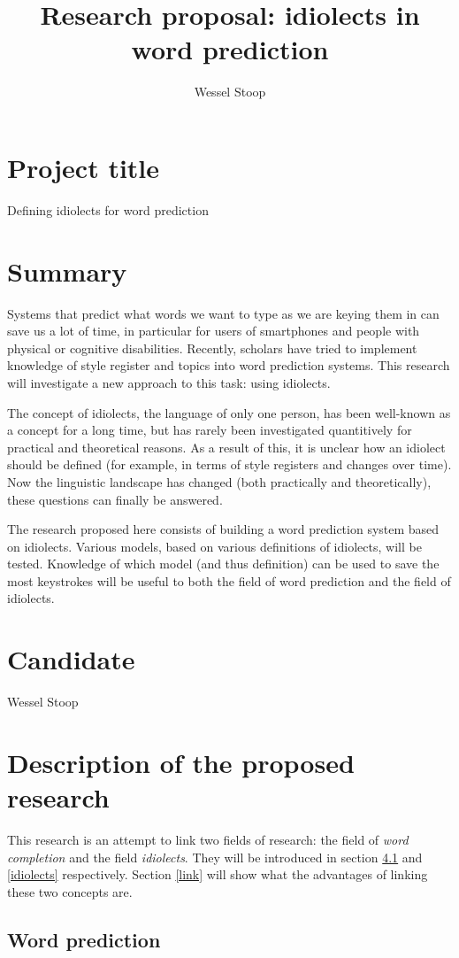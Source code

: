 \documentclass[12pt]{article}
\title{Research proposal: idiolects in word prediction}
\author{Wessel Stoop}
\begin{document}
\section{Project title}
Defining idiolects for word prediction

\section{Summary}
Systems that predict what words we want to type as we are keying them in can save us a lot of time, in particular for users of smartphones and people with physical or cognitive disabilities. Recently, scholars have tried to implement knowledge of style register and topics into word prediction systems. This research will investigate a new approach to this task: using idiolects.

The concept of idiolects, the language of only one person, has been well-known as a concept for a long time, but has rarely been investigated quantitively for practical and theoretical reasons. As a result of this, it is unclear how an idiolect should be defined (for example, in terms of style registers and changes over time). Now the linguistic landscape has changed (both practically and theoretically), these questions can finally be answered.

The research proposed here consists of building a word prediction system based on idiolects. Various models, based on various definitions of idiolects, will be tested. Knowledge of which model (and thus definition) can be used to save the most keystrokes will be useful to both the field of word prediction and the field of idiolects.

\section{Candidate}
Wessel Stoop

\section{Description of the proposed research}

This research is an attempt to link two fields of research: the field of \emph{word completion} and the field \emph{idiolects}. They will be introduced in section \ref{wordprediction} and \ref{idiolects} respectively. Section \ref{link} will show what the advantages of linking these two concepts are.

\subsection{Word prediction} \label{wordprediction}
\end{document}
